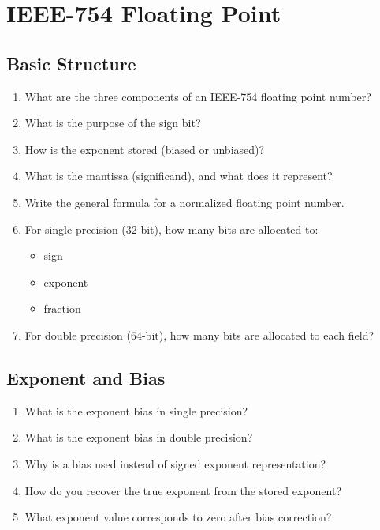\section{IEEE-754 Floating Point}

\subsection{Basic Structure}

\begin{enumerate}
  \item What are the three components of an IEEE-754 floating point number?
  \item What is the purpose of the sign bit?
  \item How is the exponent stored (biased or unbiased)?
  \item What is the mantissa (significand), and what does it represent?
  \item Write the general formula for a normalized floating point number.

  \item For single precision (32-bit), how many bits are allocated to:
    \begin{itemize}
      \item sign
      \item exponent
      \item fraction
    \end{itemize}

  \item For double precision (64-bit), how many bits are allocated to each field?
\end{enumerate}

\subsection{Exponent and Bias}

\begin{enumerate}
  \item What is the exponent bias in single precision?
  \item What is the exponent bias in double precision?
  \item Why is a bias used instead of signed exponent representation?
  \item How do you recover the true exponent from the stored exponent?
  \item What exponent value corresponds to zero after bias correction?
\end{enumerate}


